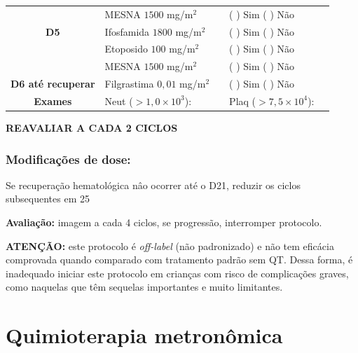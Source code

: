 \documentclass[11pt,a4paper,oldfontcommands]{memoir}
\begin{document}
\begin{center}
\begin{table}[H]
\begin{tabular}{c|p{4cm}|p{1.3cm}|p{3cm}|p{2.7cm}}
    \multicolumn{1}{c|}{\multirow{1}{*}{\textbf{}}}&{MESNA \(1500\) mg/m\(^2\)}&&{(  ) Sim (  ) Não}&\\
    \multicolumn{1}{c|}{\multirow{1}{*}{\textbf{D5}}}&{Ifosfamida \(1800\) mg/m\(^2\)}&&{(  ) Sim (  ) Não}&\\
    \multicolumn{1}{c|}{\multirow{1}{*}{\textbf{}}}&{Etoposido \(100\) mg/m\(^2\)}&&{(  ) Sim (  ) Não}&\\
    \multicolumn{1}{c|}{\multirow{1}{*}{\textbf{}}}&{MESNA \(1500\) mg/m\(^2\)}&&{(  ) Sim (  ) Não}&\\
    \multicolumn{1}{c|}{\multirow{1}{*}{\textbf{D6 até recuperar}}}&{Filgrastima \(0,01\) mg/m\(^2\)}&&{(  ) Sim (  ) Não}&\\

    \hline
    \multicolumn{1}{c|}{\multirow{1}{*}{\textbf{Exames}}}&\multicolumn{2}{l|}{Neut (\(>1,0\times10^3\)):}&{Plaq (\(>7,5\times10^4\)):}&{}\\
    \hline
\end{tabular}
\end{table}
\textbf{REAVALIAR A CADA 2 CICLOS}
\end{center}

\subsection{Modificações de dose:}
Se recuperação hematológica nâo ocorrer até o D21, reduzir os ciclos subsequentes em 25%

\textbf{Avaliação:} imagem a cada 4 ciclos, se progressão, interromper protocolo.

\textbf{ATENÇÃO:} este protocolo é \textit{off-label} (não padronizado) e não tem eficácia comprovada quando comparado com tratamento padrão sem QT. Dessa forma, é inadequado iniciar este protocolo em crianças com risco de complicações graves, como naquelas que têm sequelas importantes e muito limitantes.

\cleardoublepage
\chapter{Quimioterapia metronômica}
\cleardoublepage
\end{document}
